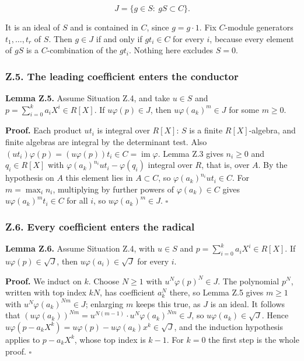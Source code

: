 \documentclass[11pt]{article}
\begin{document}
\[
J=\{g\in S:\ gS\subset C\}.
\]

It is an ideal of \(S\) and is contained in \(C\), since \(g=g\cdot1\).
Fix \(C\)-module generators \(t_1,\ldots,t_r\) of \(S\). Then \(g\in J\)
if and only if \(gt_i\in C\) for every \(i\), because every element of
\(gS\) is a \(C\)-combination of the \(gt_i\). Nothing here excludes
\(S=0\).

\subsubsection{Z.5. The leading coefficient enters the
conductor}\label{z.5.-the-leading-coefficient-enters-the-conductor}

\textbf{Lemma Z.5.} Assume Situation Z.4, and take \(u\in S\) and
\(p=\sum_{i=0}^ka_iX^i\in R[X]\). If \(u\varphi(p)\in J\), then
\(u\varphi(a_k)^m\in J\) for some \(m\ge0\).

\textbf{Proof.} Each product \(ut_i\) is integral over \(R[X]\): \(S\)
is a finite \(R[X]\)-algebra, and finite algebras are integral by the
determinant test. Also
\((ut_i)\varphi(p)=(u\varphi(p))t_i\in C=\operatorname{im}\varphi\).
Lemma Z.3 gives \(n_i\ge0\) and \(q_i\in R[X]\) with
\(\varphi(a_k)^{n_i}ut_i-\varphi(q_i)\) integral over \(R\), that is,
over \(A\). By the hypothesis on \(A\) this element lies in
\(A\subset C\), so \(\varphi(a_k)^{n_i}ut_i\in C\). For \(m=\max_in_i\),
multiplying by further powers of \(\varphi(a_k)\in C\) gives
\(u\varphi(a_k)^mt_i\in C\) for all \(i\), so \(u\varphi(a_k)^m\in J\).
\(\square\)

\subsubsection{Z.6. Every coefficient enters the
radical}\label{z.6.-every-coefficient-enters-the-radical}

\textbf{Lemma Z.6.} Assume Situation Z.4, with \(u\in S\) and
\(p=\sum_{i=0}^ka_iX^i\in R[X]\). If \(u\varphi(p)\in\sqrt J\), then
\(u\varphi(a_i)\in\sqrt J\) for every \(i\).

\textbf{Proof.} We induct on \(k\). Choose \(N\ge1\) with
\(u^N\varphi(p)^N\in J\). The polynomial \(p^N\), written with top index
\(kN\), has coefficient \(a_k^N\) there, so Lemma Z.5 gives \(m\ge1\)
with \(u^N\varphi(a_k)^{Nm}\in J\); enlarging \(m\) keeps this true, as
\(J\) is an ideal. It follows that
\((u\varphi(a_k))^{Nm}=u^{N(m-1)}\cdot u^N\varphi(a_k)^{Nm}\in J\), so
\(u\varphi(a_k)\in\sqrt J\). Hence
\(u\varphi(p-a_kX^k)=u\varphi(p)-u\varphi(a_k)x^k\in\sqrt J\), and the
induction hypothesis applies to \(p-a_kX^k\), whose top index is
\(k-1\). For \(k=0\) the first step is the whole proof. \(\square\)
\end{document}
